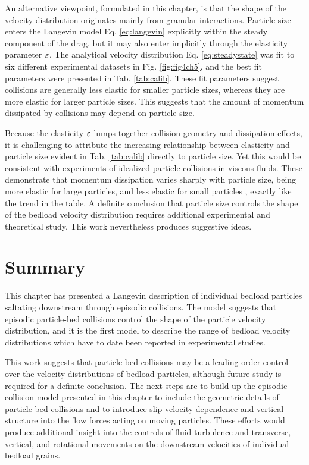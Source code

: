 An alternative viewpoint, formulated in this chapter, is that the shape of the velocity distribution originates mainly from granular interactions.
Particle size enters the Langevin model Eq. \ref{eq:langevin} explicitly within the steady component of the drag, but it may also enter implicitly through the elasticity parameter $\varepsilon$.
The analytical velocity distribution Eq. \ref{eq:steadystate} was fit to six different experimental datasets in Fig. \ref{fig:fig4ch5}, and the best fit parameters were presented in Tab. \ref{tab:calib}.
These fit parameters suggest collisions are generally less elastic for smaller particle sizes, whereas they are more elastic for larger particle sizes. This suggests that the amount of momentum dissipated by collisions may depend on particle size.

Because the elasticity $\varepsilon$ lumps together collision geometry and dissipation effects, it is challenging to attribute the increasing relationship between elasticity and particle size evident in Tab. \ref{tab:calib} directly to particle size.
Yet this would be consistent with experiments of idealized particle collisions in viscous fluids. These demonstrate that momentum dissipation varies sharply with particle size, being more elastic for large particles, and less elastic for small particles \citep{Joseph2001,Yang2006,Schmeeckle2001}, exactly like the trend in the table.
A definite conclusion that particle size controls the shape of the bedload velocity distribution requires additional experimental and theoretical study. This work nevertheless produces suggestive ideas.

\section{Summary}
\label{sec:langconclusion}
This chapter has presented a Langevin description of individual bedload particles saltating downstream through episodic collisions.
The model suggests that episodic particle-bed collisions control the shape of the particle velocity distribution, and it is the first model to describe the range of bedload velocity distributions which have to date been reported in experimental studies.

This work suggests that particle-bed collisions may be a leading order control over the velocity distributions of bedload particles, although future study is required for a definite conclusion.
The next steps are to build up the episodic collision model presented in this chapter to include the geometric details of particle-bed collisions and to introduce slip velocity dependence and vertical structure into the flow forces acting on moving particles.
These efforts would produce additional insight into the controls of fluid turbulence and transverse, vertical, and rotational movements on the downstream velocities of individual bedload grains.

